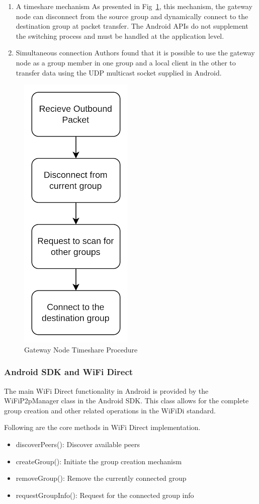 \begin{enumerate}
    \item A timeshare mechanism
          As presented in Fig~\ref{timeshare}, this mechanism, the gateway node
          can
          disconnect from the source group
          and dynamically connect to the destination group at packet transfer.
          The
          Android APIs do not supplement the switching process and must be
          handled at the
          application level\cite{funai2015}.
    \item Simultaneous connection
          Authors found that it is possible to use the gateway node as a group
          member
          in one group and a local client in the other to transfer data using
          the UDP
          multicast socket supplied in Android\cite{funai2015}.
\end{enumerate}

\begin{figure}[htbp]
    \centerline{\includegraphics[height=0.45\textwidth]{imgs/timeshare.png}}
    \caption{Gateway Node Timeshare Procedure}
    \label{timeshare}
\end{figure}

\vspace{0.3cm}

\subsubsection{Android SDK and WiFi Direct}
The main WiFi Direct functionality in Android is provided by the WiFiP2pManager
class in the Android SDK. This class allows for the complete group creation and
other related operations in the WiFiDi standard.

Following are the core methods in WiFi Direct implementation\cite{wifiman}.

\begin{itemize}
    \item discoverPeers(): Discover available peers
    \item createGroup(): Initiate the group creation mechanism
    \item removeGroup(): Remove the currently connected group
    \item requestGroupInfo(): Request for the connected group info
\end{itemize}

